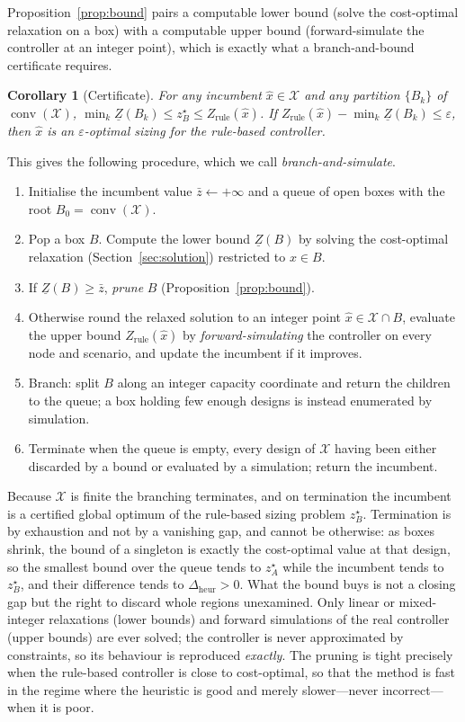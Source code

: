 \documentclass[11pt,a4paper]{article}
\theoremstyle{plain}
\newtheorem{corollary}{Corollary}
\theoremstyle{definition}
\begin{document}
Proposition~\ref{prop:bound} pairs a computable lower bound (solve the cost-optimal
relaxation on a box) with a computable upper bound (forward-simulate the controller at an
integer point), which is exactly what a branch-and-bound certificate requires.

\begin{corollary}[Certificate]
\label{cor:cert}
For any incumbent $\hat{x}\in\mathcal{X}$ and any partition $\{B_k\}$ of
$\operatorname{conv}(\mathcal{X})$,
$\min_k \underline{Z}(B_k)\le z_B^\star\le Z_{\mathrm{rule}}(\hat{x})$. If
$Z_{\mathrm{rule}}(\hat{x})-\min_k\underline{Z}(B_k)\le\varepsilon$, then $\hat{x}$ is an
$\varepsilon$-optimal sizing for the rule-based controller.
\end{corollary}

This gives the following procedure, which we call \emph{branch-and-simulate}.
\begin{enumerate}[leftmargin=2em,itemsep=1pt]
  \item Initialise the incumbent value $\bar{z}\leftarrow+\infty$ and a queue of open
  boxes with the root $B_0=\operatorname{conv}(\mathcal{X})$.
  \item Pop a box $B$. Compute the lower bound $\underline{Z}(B)$ by solving the
  cost-optimal relaxation (Section~\ref{sec:solution}) restricted to $x\in B$.
  \item If $\underline{Z}(B)\ge\bar{z}$, \emph{prune} $B$
  (Proposition~\ref{prop:bound}).
  \item Otherwise round the relaxed solution to an integer point $\hat{x}\in
  \mathcal{X}\cap B$, evaluate the upper bound $Z_{\mathrm{rule}}(\hat{x})$ by
  \emph{forward-simulating} the controller on every node and scenario, and update the
  incumbent if it improves.
  \item Branch: split $B$ along an integer capacity coordinate and return the children to
  the queue; a box holding few enough designs is instead enumerated by simulation.
  \item Terminate when the queue is empty, every design of $\mathcal{X}$ having been either
  discarded by a bound or evaluated by a simulation; return the incumbent.
\end{enumerate}
Because $\mathcal{X}$ is finite the branching terminates, and on termination the incumbent
is a certified global optimum of the rule-based sizing problem $z_B^\star$. Termination is
by exhaustion and not by a vanishing gap, and cannot be otherwise: as boxes shrink, the
bound of a singleton is exactly the cost-optimal value at that design, so the smallest bound
over the queue tends to $z_A^\star$ while the incumbent tends to $z_B^\star$, and their
difference tends to $\Delta_{\mathrm{heur}}>0$. What the bound buys is not a closing gap but
the right to discard whole regions unexamined. Only linear or mixed-integer relaxations
(lower bounds) and forward simulations of the real controller (upper bounds) are ever
solved; the controller is never approximated by constraints, so its behaviour is reproduced
\emph{exactly}. The pruning is tight precisely when the rule-based controller is close to
cost-optimal, so that the method is fast in the regime where the heuristic is good and
merely slower---never incorrect---when it is poor.
\end{document}
